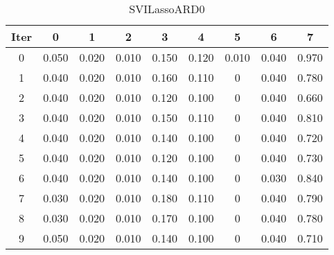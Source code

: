 \begin{table}
	\begin{center}
		\begin{tabular}{|c|c|c|c|c|c|c|c|c|}
			\hline
			Iter & 0 & 1 & 2 & 3 & 4 & 5 & 6 & 7 \\
			\hline
			0 & 0.050 & 0.020 & 0.010 & 0.150 & 0.120 & 0.010 & 0.040 & 0.970 \\
			\hline
			1 & 0.040 & 0.020 & 0.010 & 0.160 & 0.110 & 0 & 0.040 & 0.780 \\
			\hline
			2 & 0.040 & 0.020 & 0.010 & 0.120 & 0.100 & 0 & 0.040 & 0.660 \\
			\hline
			3 & 0.040 & 0.020 & 0.010 & 0.150 & 0.110 & 0 & 0.040 & 0.810 \\
			\hline
			4 & 0.040 & 0.020 & 0.010 & 0.140 & 0.100 & 0 & 0.040 & 0.720 \\
			\hline
			5 & 0.040 & 0.020 & 0.010 & 0.120 & 0.100 & 0 & 0.040 & 0.730 \\
			\hline
			6 & 0.040 & 0.020 & 0.010 & 0.140 & 0.100 & 0 & 0.030 & 0.840 \\
			\hline
			7 & 0.030 & 0.020 & 0.010 & 0.180 & 0.110 & 0 & 0.040 & 0.790 \\
			\hline
			8 & 0.030 & 0.020 & 0.010 & 0.170 & 0.100 & 0 & 0.040 & 0.780 \\
			\hline
			9 & 0.050 & 0.020 & 0.010 & 0.140 & 0.100 & 0 & 0.040 & 0.710 \\
			\hline
		\end{tabular}
	\end{center}
	\caption{SVILassoARD0}
\end{table}